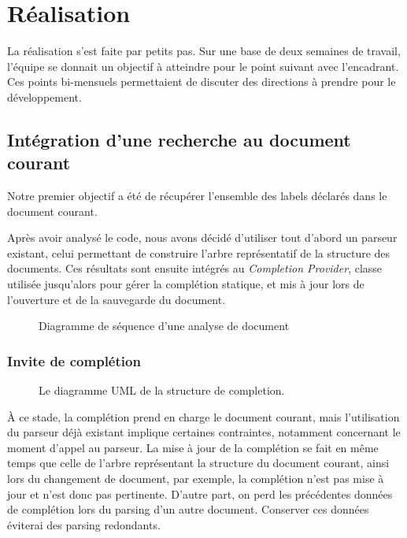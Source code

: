 \documentclass[a4paper,11pt]{report}
\begin{document}
\chapter{Réalisation}
La réalisation s'est faite par petits pas. Sur une base de deux semaines de travail, l'équipe se donnait un objectif à atteindre pour le point suivant avec l'encadrant.
Ces points bi-mensuels permettaient de discuter des directions à prendre pour le développement.

\section{Intégration d'une recherche au document courant}
Notre premier objectif a été de récupérer l'ensemble des labels déclarés dans le document courant.

Après avoir analysé le code, nous avons décidé d'utiliser tout d'abord un parseur existant, celui permettant de construire l'arbre représentatif de la structure des documents.
Ces résultats sont ensuite intégrés au \textit{Completion Provider}, classe utilisée jusqu'alors pour gérer la complétion statique, et mis à jour lors de l'ouverture et de la sauvegarde du document.

\begin{figure}[h]
\label{fig:doc_opening}
\centering

\caption{Diagramme de séquence d'une analyse de document}
\end{figure}

\subsection{Invite de complétion}
\begin{figure}[h!]
\label{fig:uml_completion_structure}
\centering

\caption{Le diagramme UML de la structure de completion.}
\end{figure}

À ce stade, la complétion prend en charge le document courant, mais l'utilisation du parseur déjà existant implique certaines contraintes, notamment concernant le moment d'appel au parseur.
La mise à jour de la complétion se fait en même temps que celle de l'arbre représentant la structure du document courant, ainsi lors du changement de document, par exemple, la complétion n'est pas mise à jour et n'est donc pas pertinente.
D'autre part, on perd les précédentes données de complétion lors du parsing d'un autre document.
Conserver ces données éviterai des parsing redondants.
\end{document}
